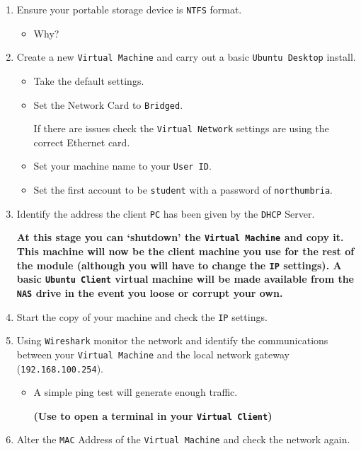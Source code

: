 \documentclass[11pt]{article}
\begin{document}
\begin{enumerate}
    \item Ensure your portable storage device is \texttt{NTFS} format.
    \begin{itemize}
        \item Why?
    \end{itemize} 
    \item Create a new \texttt{Virtual Machine} and carry out a basic \texttt{Ubuntu Desktop} install.
        \begin{itemize}
            \item Take the default settings.
            \item Set the Network Card to \texttt{Bridged}.
            \begin{tcolorbox}[title={\textbf{Note:}}]
                If there are issues check the \texttt{Virtual Network} settings are using the correct Ethernet card.
            \end{tcolorbox}
            \item Set your machine name to your \texttt{User ID}.    
            \item Set the first account to be \texttt{student} with a password of \texttt{northumbria}.    
        \end{itemize}
    \item Identify the address the client \texttt{PC} has been given by the \texttt{DHCP} Server.
    \begin{tcolorbox}[colback=blue!20]
        \textbf{At this stage you can `shutdown' the \texttt{Virtual Machine} and copy it. This machine will now be the client machine you use for the rest of the module (although you will have to change the \texttt{IP} settings). A basic \texttt{Ubuntu Client} virtual machine will be made available from the \texttt{NAS} drive in the event you loose or corrupt your own.}
    \end{tcolorbox}
    \item Start the copy of your machine and check the \texttt{IP} settings.
    \item Using \texttt{Wireshark} monitor the network and identify the communications between your \texttt{Virtual Machine} and the local network gateway (\texttt{192.168.100.254}).
        \begin{itemize}
            \item A simple ping test will generate enough traffic. 
            \begin{tcolorbox}[colback=blue!20]
                \textbf{(Use  to open a terminal in your \texttt{Virtual Client})}
            \end{tcolorbox}
        \end{itemize}
    \item Alter the \texttt{MAC} Address of the \texttt{Virtual Machine} and check the network again.
\end{enumerate}
\end{document}
